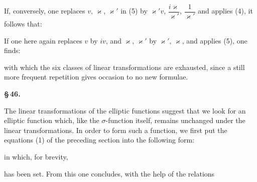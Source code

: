 
If, conversely, one replaces $v$, $\varkappa$, $\varkappa'$ in (5) by $\varkappa'v$, $\dfrac{i\varkappa}{\varkappa'}$, $\dfrac{1}{\varkappa'}$ and applies (4), it follows that:


If one here again replaces $v$ by $iv$, and $\varkappa$, $\varkappa'$ by $\varkappa'$, $\varkappa$, and applies (5), one finds:


with which the six classes of linear transformations are exhausted, since a still more frequent repetition gives occasion to no new formulae.

\begin{center}
\textbf{\S\,46. }
\end{center}

The linear transformations of the elliptic functions suggest that we look for an elliptic function which, like the $\sigma$-function itself, remains unchanged under the linear transformations. In order to form such a function, we first put the equations (1) of the preceding section into the following form:


in which, for brevity,


has been set. From this one concludes, with the help of the relations

